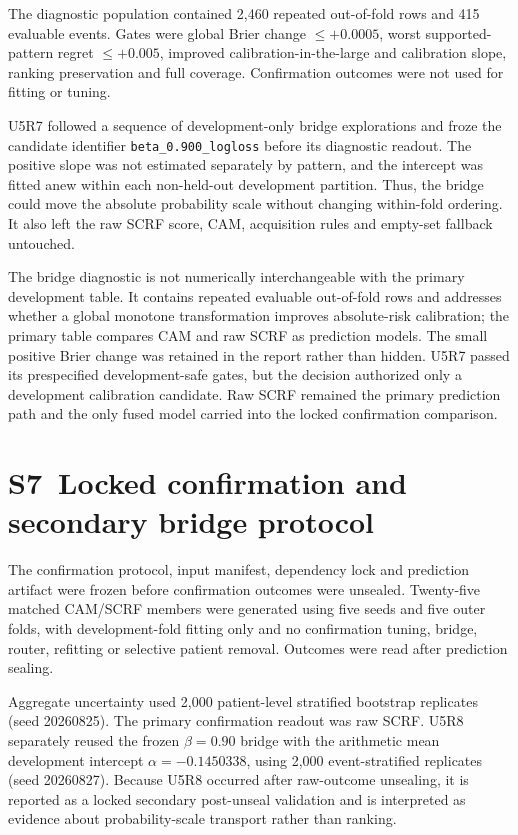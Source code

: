 \documentclass[pdflatex,sn-nature]{sn-jnl}
\begin{document}
The diagnostic population contained 2,460 repeated out-of-fold rows and 415 evaluable events. Gates were global Brier change $\le +0.0005$, worst supported-pattern regret $\le +0.005$, improved calibration-in-the-large and calibration slope, ranking preservation and full coverage. Confirmation outcomes were not used for fitting or tuning.

U5R7 followed a sequence of development-only bridge explorations and froze the candidate identifier \texttt{beta\_0.900\_logloss} before its diagnostic readout. The positive slope was not estimated separately by pattern, and the intercept was fitted anew within each non-held-out development partition. Thus, the bridge could move the absolute probability scale without changing within-fold ordering. It also left the raw SCRF score, CAM, acquisition rules and empty-set fallback untouched.

The bridge diagnostic is not numerically interchangeable with the primary development table. It contains repeated evaluable out-of-fold rows and addresses whether a global monotone transformation improves absolute-risk calibration; the primary table compares CAM and raw SCRF as prediction models. The small positive Brier change was retained in the report rather than hidden. U5R7 passed its prespecified development-safe gates, but the decision authorized only a development calibration candidate. Raw SCRF remained the primary prediction path and the only fused model carried into the locked confirmation comparison.

\section*{S7~Locked confirmation and secondary bridge protocol}
The confirmation protocol, input manifest, dependency lock and prediction artifact were frozen before confirmation outcomes were unsealed. Twenty-five matched CAM/SCRF members were generated using five seeds and five outer folds, with development-fold fitting only and no confirmation tuning, bridge, router, refitting or selective patient removal. Outcomes were read after prediction sealing.

Aggregate uncertainty used 2,000 patient-level stratified bootstrap replicates (seed 20260825). The primary confirmation readout was raw SCRF. U5R8 separately reused the frozen $\beta=0.90$ bridge with the arithmetic mean development intercept $\alpha=-0.1450338$, using 2,000 event-stratified replicates (seed 20260827). Because U5R8 occurred after raw-outcome unsealing, it is reported as a locked secondary post-unseal validation and is interpreted as evidence about probability-scale transport rather than ranking.
\end{document}
